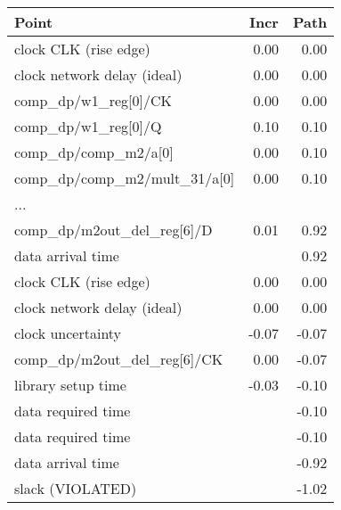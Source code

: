 
\begin{tabular}[t]{|lrr|}  
	\hline
	\textbf{Point}                                                  & \textbf{Incr}   &    \textbf{Path}\\\hline
clock CLK (rise edge)                                 &  0.00     &   0.00\\
clock network delay (ideal)                          &    0.00     &  0.00\\
comp\_dp/w1\_reg[0]/CK                     &    0.00     &   0.00 \\
comp\_dp/w1\_reg[0]/Q                          &  0.10   &     0.10\\ comp\_dp/comp\_m2/a[0]  &0.00    &    0.10\\
comp\_dp/comp\_m2/mult\_31/a[0]  & 0.00     &   0.10       \\
...& &\\
comp\_dp/m2out\_del\_reg[6]/D       &              0.01    &    0.92\\
data arrival time               &                 &                    0.92\\
\hline
clock CLK (rise edge)                        &            0.00     &   0.00\\
clock network delay (ideal)                    &          0.00      &  0.00\\
clock uncertainty                              &         -0.07   &    -0.07\\
comp\_dp/m2out\_del\_reg[6]/CK  &                   0.00    &   -0.07 \\
library setup time                &                      -0.03    &   -0.10\\
data required time                                           & &      -0.10\\
\hline
data required time                                          &  &       -0.10\\
data arrival time                                             &  &     -0.92\\
\hline
slack (VIOLATED)                                                &  &   -1.02\\\hline

\end{tabular}


